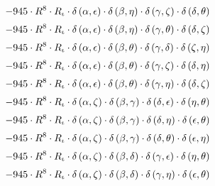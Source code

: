 \begin{subequations}
\begin{gather}
 \\[0.2em] \notag 		 - 945 \cdot R^{8} \cdot R_{\iota{}} \cdot \delta{}\left(\alpha{}, \epsilon{}\right) \cdot \delta{}\left(\beta{}, \eta{}\right) \cdot \delta{}\left(\gamma{}, \zeta{}\right) \cdot \delta{}\left(\delta{}, \theta{}\right) 
 \\[0.2em] \notag 		 - 945 \cdot R^{8} \cdot R_{\iota{}} \cdot \delta{}\left(\alpha{}, \epsilon{}\right) \cdot \delta{}\left(\beta{}, \eta{}\right) \cdot \delta{}\left(\gamma{}, \theta{}\right) \cdot \delta{}\left(\delta{}, \zeta{}\right) 
 \\[0.2em] \notag 		 - 945 \cdot R^{8} \cdot R_{\iota{}} \cdot \delta{}\left(\alpha{}, \epsilon{}\right) \cdot \delta{}\left(\beta{}, \theta{}\right) \cdot \delta{}\left(\gamma{}, \delta{}\right) \cdot \delta{}\left(\zeta{}, \eta{}\right) 
 \\[0.2em] \notag 		 - 945 \cdot R^{8} \cdot R_{\iota{}} \cdot \delta{}\left(\alpha{}, \epsilon{}\right) \cdot \delta{}\left(\beta{}, \theta{}\right) \cdot \delta{}\left(\gamma{}, \zeta{}\right) \cdot \delta{}\left(\delta{}, \eta{}\right) 
 \\[0.2em] \notag 		 - 945 \cdot R^{8} \cdot R_{\iota{}} \cdot \delta{}\left(\alpha{}, \epsilon{}\right) \cdot \delta{}\left(\beta{}, \theta{}\right) \cdot \delta{}\left(\gamma{}, \eta{}\right) \cdot \delta{}\left(\delta{}, \zeta{}\right) 
 \\[0.2em] \notag 		 - 945 \cdot R^{8} \cdot R_{\iota{}} \cdot \delta{}\left(\alpha{}, \zeta{}\right) \cdot \delta{}\left(\beta{}, \gamma{}\right) \cdot \delta{}\left(\delta{}, \epsilon{}\right) \cdot \delta{}\left(\eta{}, \theta{}\right) 
 \\[0.2em] \notag 		 - 945 \cdot R^{8} \cdot R_{\iota{}} \cdot \delta{}\left(\alpha{}, \zeta{}\right) \cdot \delta{}\left(\beta{}, \gamma{}\right) \cdot \delta{}\left(\delta{}, \eta{}\right) \cdot \delta{}\left(\epsilon{}, \theta{}\right) 
 \\[0.2em] \notag 		 - 945 \cdot R^{8} \cdot R_{\iota{}} \cdot \delta{}\left(\alpha{}, \zeta{}\right) \cdot \delta{}\left(\beta{}, \gamma{}\right) \cdot \delta{}\left(\delta{}, \theta{}\right) \cdot \delta{}\left(\epsilon{}, \eta{}\right) 
 \\[0.2em] \notag 		 - 945 \cdot R^{8} \cdot R_{\iota{}} \cdot \delta{}\left(\alpha{}, \zeta{}\right) \cdot \delta{}\left(\beta{}, \delta{}\right) \cdot \delta{}\left(\gamma{}, \epsilon{}\right) \cdot \delta{}\left(\eta{}, \theta{}\right) 
 \\[0.2em] \notag 		 - 945 \cdot R^{8} \cdot R_{\iota{}} \cdot \delta{}\left(\alpha{}, \zeta{}\right) \cdot \delta{}\left(\beta{}, \delta{}\right) \cdot \delta{}\left(\gamma{}, \eta{}\right) \cdot \delta{}\left(\epsilon{}, \theta{}\right) 

\end{gather}
\end{subequations}
